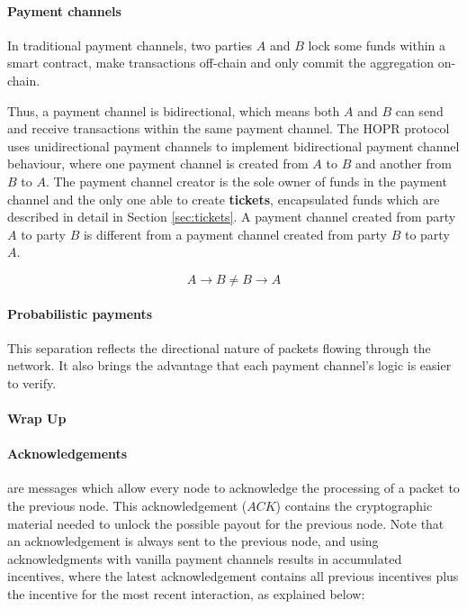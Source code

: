 
\paragraph{Payment channels}

In traditional payment channels, two parties $A$ and $B$ lock some funds within a smart contract, make transactions off-chain and only commit the aggregation on-chain.



Thus, a payment channel is bidirectional, which means both $A$ and $B$ can send and receive transactions within the same payment channel. The HOPR protocol uses unidirectional payment channels to implement bidirectional payment channel behaviour, where one payment channel is created from $A$ to $B$ and another from $B$ to $A$. The payment channel creator is the sole owner of funds in the payment channel and the only one able to create \textbf{tickets}, encapsulated funds which are described in detail in Section \ref{sec:tickets}. A payment channel created from party $A$ to party $B$ is different from a payment channel created from party $B$ to party $A$.

$$A\rightarrow B \neq B\rightarrow A$$

\paragraph{Probabilistic payments}

This separation reflects the directional nature of packets flowing through the network. It also brings the advantage that each payment channel's logic is easier to verify.

\paragraph{Wrap Up}

\paragraph{Acknowledgements} are messages which allow every node to acknowledge the processing of a packet to the previous node. This acknowledgement ($ACK$) contains the cryptographic material needed to unlock the possible payout for the previous node. Note that an acknowledgement is always sent to the previous node, and using acknowledgments with vanilla payment channels results in accumulated incentives, where the latest acknowledgement contains all previous incentives plus the incentive for the most recent interaction, as explained below:

